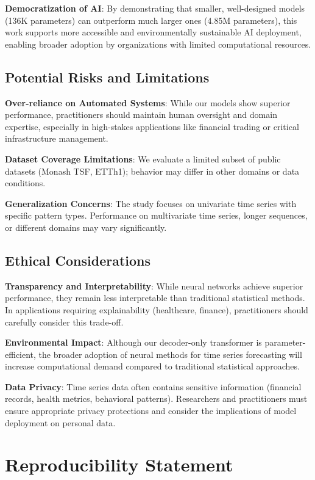 \documentclass[11pt]{article}
\begin{document}
\textbf{Democratization of AI}: By demonstrating that smaller, well-designed models (136K parameters) can outperform much larger ones (4.85M parameters), this work supports more accessible and environmentally sustainable AI deployment, enabling broader adoption by organizations with limited computational resources.

\subsection*{Potential Risks and Limitations}

\textbf{Over-reliance on Automated Systems}: While our models show superior performance, practitioners should maintain human oversight and domain expertise, especially in high-stakes applications like financial trading or critical infrastructure management.

\textbf{Dataset Coverage Limitations}: We evaluate a limited subset of public datasets (Monash TSF, ETTh1); behavior may differ in other domains or data conditions.

\textbf{Generalization Concerns}: The study focuses on univariate time series with specific pattern types. Performance on multivariate time series, longer sequences, or different domains may vary significantly.

\subsection*{Ethical Considerations}

\textbf{Transparency and Interpretability}: While neural networks achieve superior performance, they remain less interpretable than traditional statistical methods. In applications requiring explainability (healthcare, finance), practitioners should carefully consider this trade-off.

\textbf{Environmental Impact}: Although our decoder-only transformer is parameter-efficient, the broader adoption of neural methods for time series forecasting will increase computational demand compared to traditional statistical approaches.

\textbf{Data Privacy}: Time series data often contains sensitive information (financial records, health metrics, behavioral patterns). Researchers and practitioners must ensure appropriate privacy protections and consider the implications of model deployment on personal data.

\section*{Reproducibility Statement}
\end{document}
